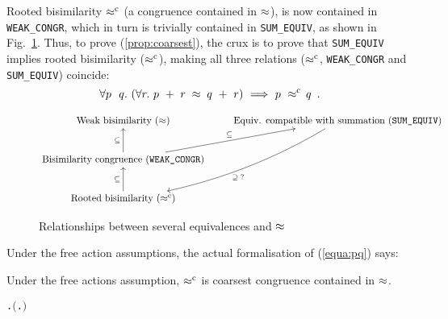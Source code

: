Rooted bisimilarity $\mathrel{\approx^{\rm{c}}}$ (a congruence contained in
$\approx$), is now contained in \texttt{WEAK_CONGR},
which in turn is trivially contained in \texttt{SUM_EQUIV}, as shown
in Fig.~\ref{fig:relationship}. Thus, to prove (\ref{prop:coarsest}),
the crux is to prove that \texttt{SUM_EQUIV} implies
rooted bisimilarity ($\mathrel{\approx^{\rm{c}}}$), making all three relations
($\mathrel{\approx^{\rm{c}}}$, \texttt{WEAK_CONGR} and \texttt{SUM_EQUIV}) coincide:
\begin{equation}
\label{equa:pq}
\forall p\ \ q.\ ( \forall r.\ p\ +\ r \;\approx\; q\ +\ r ) \
\Longrightarrow\ p\ \mathrel{\approx^{\rm{c}}}\ \! q\enspace.
\end{equation}

\begin{figure}[ht]
\begin{displaymath}
\xymatrix{
{\textrm{Weak bisimilarity } (\approx)} & {\textrm{Equiv.
    compatible with summation (\texttt{SUM\_EQUIV})}}
\ar@/^3ex/[ldd]^{\supseteq\; ?}\\
{\textrm{Bisimilarity congruence (\texttt{WEAK\_CONGR})}}
\ar[u]^{\subseteq} \ar[ru]^{\subseteq} \\
{\textrm{Rooted bisimilarity } (\rapprox)} \ar[u]^{\subseteq}
}
\end{displaymath}
\caption{Relationships between several equivalences and $\approx$}
\label{fig:relationship}
\end{figure}

Under the free action assumptions, the actual formalisation of (\ref{equa:pq}) says:
\begin{theorem}
  Under the free actions assumption, $\mathrel{\approx^{\rm{c}}}$ is coarsest congruence contained in $\approx$.
\begin{alltt}
\HOLTokenTurnstile{} \HOLSymConst{\HOLTokenForall{}} .   \HOLSymConst{\HOLTokenConj{}}   \HOLSymConst{\HOLTokenImp{}} \ensuremath{(}\HOLSymConst{\HOLTokenForall{}}.  \HOLSymConst{\ensuremath{+}}  \HOLSymConst{\HOLTokenWeakEQ}  \HOLSymConst{\ensuremath{+}} \ensuremath{)} \HOLSymConst{\HOLTokenImp{}}  \HOLSymConst{\HOLTokenObsCongr} 
\end{alltt}
\end{theorem}

